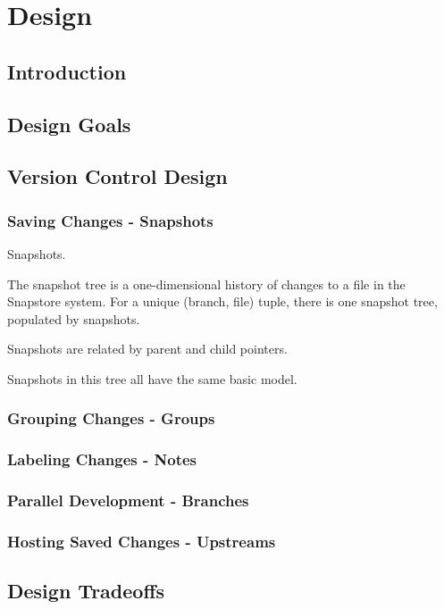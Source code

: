 \chapter{Design}

\section{Introduction}

\section{Design Goals}

\section{Version Control Design}

\subsection{Saving Changes - Snapshots}
Snapshots.

The snapshot tree is a one-dimensional history of changes to a file in the Snapstore system. For a unique (branch, file) tuple, there is one snapshot tree, populated by snapshots. 

Snapshots are related by parent and child pointers.

Snapshots in this tree all have the same basic model. 

\subsection{Grouping Changes - Groups}

\subsection{Labeling Changes - Notes}

\subsection{Parallel Development - Branches}

\subsection{Hosting Saved Changes - Upstreams}

\section{Design Tradeoffs}